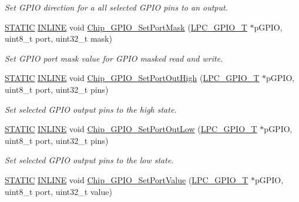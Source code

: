 \begin{DoxyCompactItemize}
\begin{DoxyCompactList}\small\item\em Set G\+P\+IO direction for a all selected G\+P\+IO pins to an output. \end{DoxyCompactList}\item 
\hyperlink{group__LPC__Types__Public__Macros_ga10b2d890d871e1489bb02b7e70d9bdfb}{S\+T\+A\+T\+IC} \hyperlink{group__LPC__Types__Public__Types_ga2eb6f9e0395b47b8d5e3eeae4fe0c116}{I\+N\+L\+I\+NE} void \hyperlink{group__GPIO__17XX__40XX_gaee2115e847a281cf3da40209ce6336c8}{Chip\+\_\+\+G\+P\+I\+O\+\_\+\+Set\+Port\+Mask} (\hyperlink{structLPC__GPIO__T}{L\+P\+C\+\_\+\+G\+P\+I\+O\+\_\+T} $\ast$p\+G\+P\+IO, uint8\+\_\+t port, uint32\+\_\+t mask)
\begin{DoxyCompactList}\small\item\em Set G\+P\+IO port mask value for G\+P\+IO masked read and write. \end{DoxyCompactList}\item 
\hyperlink{group__LPC__Types__Public__Macros_ga10b2d890d871e1489bb02b7e70d9bdfb}{S\+T\+A\+T\+IC} \hyperlink{group__LPC__Types__Public__Types_ga2eb6f9e0395b47b8d5e3eeae4fe0c116}{I\+N\+L\+I\+NE} void \hyperlink{group__GPIO__17XX__40XX_ga8a9b2dd9c70e835b718c2edc5b9701af}{Chip\+\_\+\+G\+P\+I\+O\+\_\+\+Set\+Port\+Out\+High} (\hyperlink{structLPC__GPIO__T}{L\+P\+C\+\_\+\+G\+P\+I\+O\+\_\+T} $\ast$p\+G\+P\+IO, uint8\+\_\+t port, uint32\+\_\+t pins)
\begin{DoxyCompactList}\small\item\em Set selected G\+P\+IO output pins to the high state. \end{DoxyCompactList}\item 
\hyperlink{group__LPC__Types__Public__Macros_ga10b2d890d871e1489bb02b7e70d9bdfb}{S\+T\+A\+T\+IC} \hyperlink{group__LPC__Types__Public__Types_ga2eb6f9e0395b47b8d5e3eeae4fe0c116}{I\+N\+L\+I\+NE} void \hyperlink{group__GPIO__17XX__40XX_ga2f85c3b0c7a48d68a508a0f94f6e691e}{Chip\+\_\+\+G\+P\+I\+O\+\_\+\+Set\+Port\+Out\+Low} (\hyperlink{structLPC__GPIO__T}{L\+P\+C\+\_\+\+G\+P\+I\+O\+\_\+T} $\ast$p\+G\+P\+IO, uint8\+\_\+t port, uint32\+\_\+t pins)
\begin{DoxyCompactList}\small\item\em Set selected G\+P\+IO output pins to the low state. \end{DoxyCompactList}\item 
\hyperlink{group__LPC__Types__Public__Macros_ga10b2d890d871e1489bb02b7e70d9bdfb}{S\+T\+A\+T\+IC} \hyperlink{group__LPC__Types__Public__Types_ga2eb6f9e0395b47b8d5e3eeae4fe0c116}{I\+N\+L\+I\+NE} void \hyperlink{group__GPIO__17XX__40XX_ga095eb3a5396553fa88997b4cfd21e644}{Chip\+\_\+\+G\+P\+I\+O\+\_\+\+Set\+Port\+Value} (\hyperlink{structLPC__GPIO__T}{L\+P\+C\+\_\+\+G\+P\+I\+O\+\_\+T} $\ast$p\+G\+P\+IO, uint8\+\_\+t port, uint32\+\_\+t value)

\end{DoxyCompactItemize}

